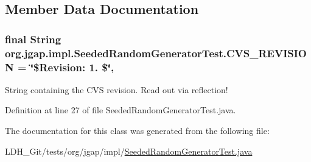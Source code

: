 \subsection{Member Data Documentation}
\hypertarget{classorg_1_1jgap_1_1impl_1_1_seeded_random_generator_test_aa246a264dd458674a292e09dd5eecdcf}{
\subsubsection[{C\-V\-S\-\_\-\-R\-E\-V\-I\-S\-I\-O\-N}]{\setlength{\rightskip}{0pt plus 5cm}final String org.\-jgap.\-impl.\-Seeded\-Random\-Generator\-Test.\-C\-V\-S\-\_\-\-R\-E\-V\-I\-S\-I\-O\-N = \char`\"{}\$Revision\-: 1. \$\char`\"{}\hspace{0.3cm}{\ttfamily [static]}, {\ttfamily [private]}}}\label{classorg_1_1jgap_1_1impl_1_1_seeded_random_generator_test_aa246a264dd458674a292e09dd5eecdcf}
String containing the C\-V\-S revision. Read out via reflection! 

Definition at line 27 of file Seeded\-Random\-Generator\-Test.\-java.



The documentation for this class was generated from the following file\-:\begin{DoxyCompactItemize}
\item 
L\-D\-H\-\_\-\-Git/tests/org/jgap/impl/\hyperlink{_seeded_random_generator_test_8java}{Seeded\-Random\-Generator\-Test.\-java}\end{DoxyCompactItemize}
